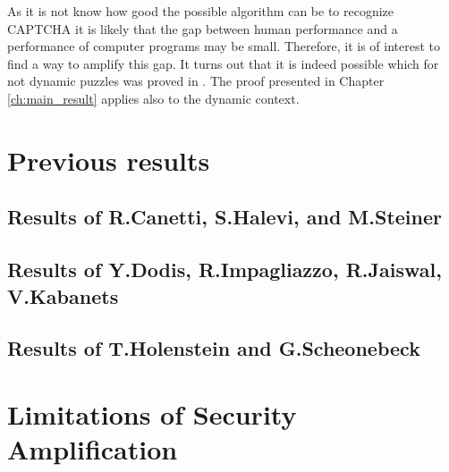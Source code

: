 \documentclass[11pt,a4paper,titlepage]{memoir}
\begin{document}
As it is not know how good the possible algorithm can be to recognize CAPTCHA it is likely that the gap between human
performance and a performance of computer programs may be small. Therefore, it is of interest to find a way to amplify this gap.
It turns out that it is indeed possible which for not dynamic puzzles was proved in \cite{DBLP:journals/corr/abs-1002-3534}.
The proof presented in Chapter \ref{ch:main_result} applies also to the dynamic context.


\section{Previous results}
\label{st:previous_results}
\subsection{Results of R.Canetti, S.Halevi, and M.Steiner}
\subsection{Results of Y.Dodis, R.Impagliazzo, R.Jaiswal, V.Kabanets}
\subsection{Results of T.Holenstein and G.Scheonebeck}
\section{Limitations of Security Amplification}



\appendix


\backmatter



\end{document}

